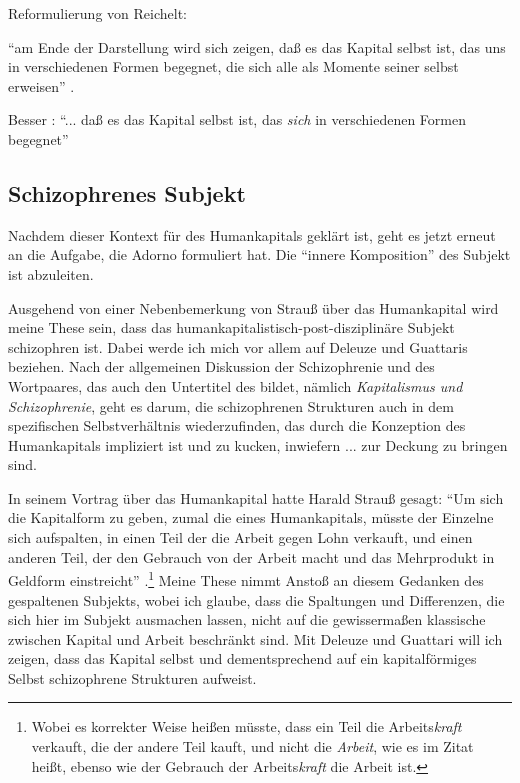 \documentclass[12pt,
               DIV13,
               paper=a4,
               twoside=false,
               onehalfspacing,
               bibliography=totoc,
               toc=graduated,
               draft,
               ]{scrartcl}
\newcommand{\pc}[2]{\parencite[#1]{#2}}
\newcommand{\worries}[1]{\ifdraft{\textcolor{blue}{\texttt{(#1)}}}{}}
\begin{document}
Reformulierung von Reichelt:

"`am Ende der Darstellung wird sich zeigen, daß es das Kapital selbst
ist, das uns in verschiedenen Formen begegnet, die sich alle als
Momente seiner selbst erweisen"' \pc{181}{reichelt}.

Besser \worries{?}: "`... daß es das Kapital selbst ist, das
\emph{sich} in verschiedenen Formen begegnet"'



\subsection{Schizophrenes Subjekt}

Nachdem dieser Kontext für des Humankapitals geklärt ist, geht es
jetzt erneut an die Aufgabe, die Adorno formuliert hat. Die "`innere
Komposition"' \pc{261}{min} des Subjekt ist abzuleiten.

Ausgehend von einer Nebenbemerkung von Strauß über das Humankapital
wird meine These sein, dass das humankapitalistisch-post-disziplinäre
Subjekt schizophren ist. Dabei werde ich mich vor allem auf Deleuze
und Guattaris  beziehen. Nach der allgemeinen Diskussion
der Schizophrenie und des Wortpaares, das auch den Untertitel des
 bildet, nämlich \emph{Kapitalismus und Schizophrenie},
geht es darum, die schizophrenen Strukturen auch in dem spezifischen
Selbstverhältnis wiederzufinden, das durch die Konzeption des
Humankapitals impliziert ist und zu kucken, inwiefern ... zur Deckung
zu bringen sind.

In seinem Vortrag über das Humankapital hatte Harald Strauß gesagt:
"`Um sich die Kapitalform zu geben, zumal die eines Humankapitals,
müsste der Einzelne sich aufspalten, in einen Teil der die Arbeit
gegen Lohn verkauft, und einen anderen Teil, der den Gebrauch von der
Arbeit macht und das Mehrprodukt in Geldform einstreicht"' \pc{S.
126}{strauss}.\footnote{Wobei es korrekter Weise heißen müsste, dass
ein Teil die Arbeits\emph{kraft} verkauft, die der andere Teil kauft,
und nicht die \emph{Arbeit}, wie es im Zitat heißt, ebenso wie der
Gebrauch der Arbeits\emph{kraft} die Arbeit ist.} Meine These nimmt
Anstoß an diesem Gedanken des gespaltenen Subjekts, wobei ich glaube,
dass die Spaltungen und Differenzen, die sich hier im Subjekt
ausmachen lassen, nicht auf die gewissermaßen klassische zwischen
Kapital und Arbeit beschränkt sind. Mit Deleuze und Guattari will ich
zeigen, dass das Kapital selbst und dementsprechend auf ein
kapitalförmiges Selbst schizophrene Strukturen aufweist.
\end{document}
